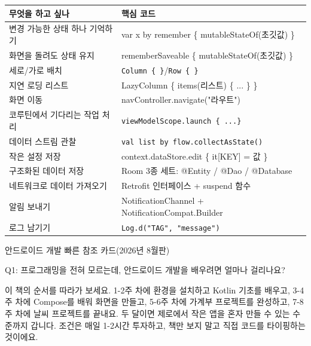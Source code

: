 


\begin{center}
\begin{tabularx}{\linewidth}{|X|X|}
\hline
\textbf{무엇을 하고 싶나} & \textbf{핵심 코드} \tabularnewline
\hline
변경 가능한 상태 하나 기억하기 & var x by remember \{ mutableStateOf(초깃값) \} \tabularnewline
화면을 돌려도 상태 유지 & rememberSaveable \{ mutableStateOf(초깃값) \} \tabularnewline
세로/가로 배치 & \texttt{Column \{ \}}/\texttt{Row \{ \}} \tabularnewline
지연 로딩 리스트 & LazyColumn \{ items(리스트) \{ ... \} \} \tabularnewline
화면 이동 & navController.navigate("라우트") \tabularnewline
코루틴에서 기다리는 작업 처리 & \texttt{viewModelScope.\allowbreak launch \{ .\allowbreak .\allowbreak .\allowbreak  \}} \tabularnewline
데이터 스트림 관찰 & \texttt{val list by flow.\allowbreak collectAsState()} \tabularnewline
작은 설정 저장 & context.dataStore.edit \{ it[KEY] = 값 \} \tabularnewline
구조화된 데이터 저장 & Room 3종 세트: @Entity / @Dao / @Database \tabularnewline
네트워크로 데이터 가져오기 & Retrofit 인터페이스 + suspend 함수 \tabularnewline
알림 보내기 & NotificationChannel + NotificationCompat.Builder \tabularnewline
로그 남기기 & \texttt{Log.\allowbreak d("TAG", "message")} \tabularnewline
\hline
\end{tabularx}
\end{center}

\begin{center}\small\color{gray}안드로이드 개발 빠른 참조 카드(2026년 8월판)\end{center}


Q1: 프로그래밍을 전혀 모르는데, 안드로이드 개발을 배우려면 얼마나 걸리나요?

이 책의 순서를 따라가 보세요. 1-2주 차에 환경을 설치하고 Kotlin 기초를 배우고, 3-4주 차에 Compose를 배워 화면을 만들고, 5-6주 차에 가계부 프로젝트를 완성하고, 7-8주 차에 날씨 프로젝트를 끝내요. 두 달이면 제로에서 작은 앱을 혼자 만들 수 있는 수준까지 갑니다. 조건은 매일 1-2시간 투자하고, 책만 보지 말고 직접 코드를 타이핑하는 것이에요.

